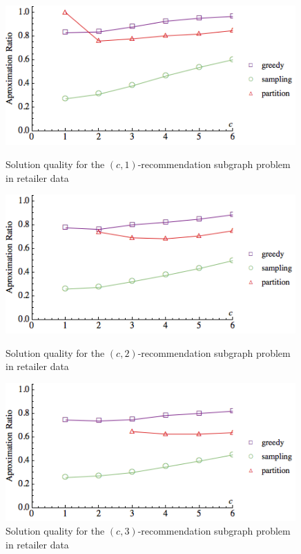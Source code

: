 \begin{figure}[h]
\centering
\begin{minipage}[h]{0.48\textwidth}
\centering
\includegraphics[width=0.99\textwidth]{images/real_a=1_new.png}

\caption{Solution quality for the $(c, 1)$-recommendation subgraph problem in retailer data}
\label{fig:real_a=1}
\end{minipage}

\hspace{0cm}
\begin{minipage}[h]{0.48\textwidth}
\centering
\includegraphics[width=0.99\textwidth]{images/real_a=2_new.png}

\caption{Solution quality for the $(c, 2)$-recommendation subgraph problem in retailer data}
\label{fig:real_a=2}
\end{minipage}

\hspace{0cm}
\begin{minipage}[h]{0.48\textwidth}
\centering
\includegraphics[width=0.99\textwidth]{images/real_a=3_new.png}

\caption{Solution quality for the $(c, 3)$-recommendation subgraph problem in retailer data}
\label{fig:real_a=3}
\end{minipage}
\vspace{-.3cm}
\end{figure} \vs

